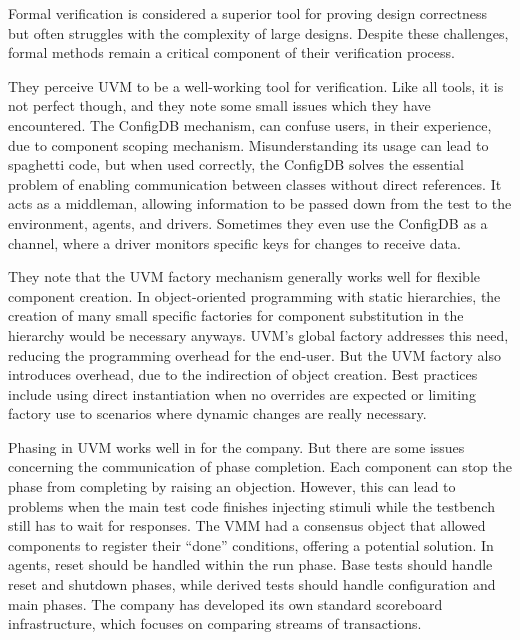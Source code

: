 \documentclass[12pt]{report}
\begin{document}
Formal verification is considered a superior tool for proving design correctness but often struggles with the
complexity of large designs. Despite these challenges, formal methods remain a critical component of their verification process.

They perceive UVM to be a well-working tool for verification. Like all tools, it is not perfect though, and they note
some small issues which they have encountered. The ConfigDB mechanism, can confuse users, in their experience, due to
component scoping mechanism. Misunderstanding its usage can lead to spaghetti code, but when used correctly, the
ConfigDB solves the essential problem of enabling communication between classes without direct references. It acts as
a middleman, allowing information to be passed down from the test to the environment, agents, and drivers. Sometimes
they even use the ConfigDB as a channel, where a driver monitors specific keys for changes to receive data.

They note that the UVM factory mechanism generally works well for flexible component creation. In object-oriented
programming with static hierarchies, the creation of many small specific factories for component substitution in the
hierarchy would be necessary anyways. UVM's global factory addresses this need, reducing the programming overhead for
the end-user. But the UVM factory also introduces overhead, due to the indirection of object creation. Best practices
include using direct instantiation when no overrides are expected or limiting factory use to scenarios where dynamic
changes are really necessary.

Phasing in UVM works well in for the company. But there are some issues concerning the communication of phase
completion. Each component can stop the phase from completing by raising an objection. However, this can lead to
problems when the main test code finishes injecting stimuli while the testbench still has to wait for responses. The
VMM had a consensus object that allowed components to register their “done” conditions, offering a potential
solution. In agents, reset should be handled within the run phase. Base tests should handle reset and shutdown
phases, while derived tests should handle configuration and main phases. The company has developed its own standard
scoreboard infrastructure, which focuses on comparing streams of transactions.
\end{document}
